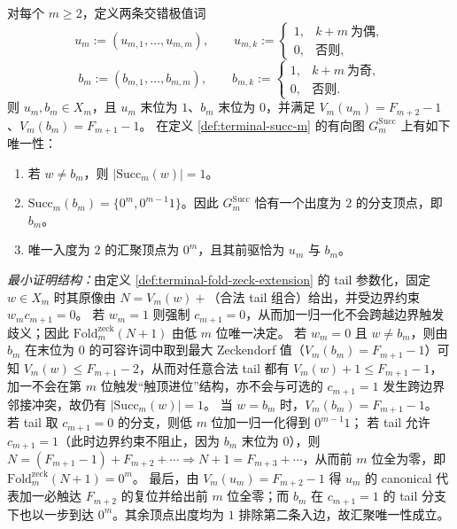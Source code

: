 \begin{enumerate}
  \begin{theorem}\label{thm:terminal-succ-unique-branch-merge}
  对每个 \(m\ge 2\)，定义两条交错极值词
  \[
  u_m:=(u_{m,1},\dots,u_{m,m}),\qquad
  u_{m,k}:=
  \begin{cases}
    1,& k+m\ \text{为偶},\\
    0,& \text{否则},
  \end{cases}
  \]
  \[
  b_m:=(b_{m,1},\dots,b_{m,m}),\qquad
  b_{m,k}:=
  \begin{cases}
    1,& k+m\ \text{为奇},\\
    0,& \text{否则}.
  \end{cases}
  \]
  则 \(u_m,b_m\in X_m\)，且 \(u_m\) 末位为 \(1\)、\(b_m\) 末位为 \(0\)，并满足
  \(V_m(u_m)=F_{m+2}-1\)、\(V_m(b_m)=F_{m+1}-1\)。
  在定义 \ref{def:terminal-succ-m} 的有向图 \(G^{\mathrm{Succ}}_m\) 上有如下唯一性：
  \begin{enumerate}
    \item 若 \(w\neq b_m\)，则 \(|\mathrm{Succ}_m(w)|=1\)。
    \item \(\mathrm{Succ}_m(b_m)=\{0^m,0^{m-1}1\}\)。因此 \(G^{\mathrm{Succ}}_m\) 恰有一个出度为 \(2\) 的分支顶点，即 \(b_m\)。
    \item 唯一入度为 \(2\) 的汇聚顶点为 \(0^m\)，且其前驱恰为 \(u_m\) 与 \(b_m\)。
  \end{enumerate}
  \emph{最小证明结构：}由定义 \ref{def:terminal-fold-zeck-extension} 的 tail 参数化，固定 \(w\in X_m\) 时其原像由 \(N=V_m(w)+\)（合法 tail 组合）给出，并受边界约束 \(w_m c_{m+1}=0\)。
  若 \(w_m=1\) 则强制 \(c_{m+1}=0\)，从而加一归一化不会跨越边界触发歧义；因此 \(\mathrm{Fold}^{\mathrm{zeck}}_m(N+1)\) 由低 \(m\) 位唯一决定。
  若 \(w_m=0\) 且 \(w\neq b_m\)，则由 \(b_m\) 在末位为 \(0\) 的可容许词中取到最大 Zeckendorf 值（\(V_m(b_m)=F_{m+1}-1\)）可知 \(V_m(w)\le F_{m+1}-2\)，从而对任意合法 tail 都有 \(V_m(w)+1\le F_{m+1}-1\)，加一不会在第 \(m\) 位触发“触顶进位”结构，亦不会与可选的 \(c_{m+1}=1\) 发生跨边界邻接冲突，故仍有 \(|\mathrm{Succ}_m(w)|=1\)。
  当 \(w=b_m\) 时，\(V_m(b_m)=F_{m+1}-1\)。
  若 tail 取 \(c_{m+1}=0\) 的分支，则低 \(m\) 位加一归一化得到 \(0^{m-1}1\)；
  若 tail 允许 \(c_{m+1}=1\)（此时边界约束不阻止，因为 \(b_m\) 末位为 \(0\)），则
  \(N=(F_{m+1}-1)+F_{m+2}+\cdots\Rightarrow N+1=F_{m+3}+\cdots\)，从而前 \(m\) 位全为零，即 \(\mathrm{Fold}^{\mathrm{zeck}}_m(N+1)=0^m\)。
  最后，由 \(V_m(u_m)=F_{m+2}-1\) 得 \(u_m\) 的 canonical 代表加一必触达 \(F_{m+2}\) 的复位并给出前 \(m\) 位全零；而 \(b_m\) 在 \(c_{m+1}=1\) 的 tail 分支下也以一步到达 \(0^m\)。其余顶点出度均为 \(1\) 排除第二条入边，故汇聚唯一性成立。
  \end{theorem}
  


\end{enumerate}
